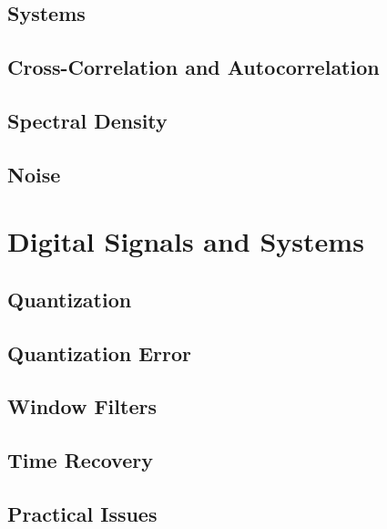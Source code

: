 \begin{refsection}
\subsection{Systems}

\subsection{Cross-Correlation and Autocorrelation}

\subsection{Spectral Density}

\subsection{Noise}

\section{Digital Signals and Systems}

\subsection{Quantization}

\subsection{Quantization Error}

\subsection{Window Filters}

\subsection{Time Recovery}

\subsection{Practical Issues}

{}
\printbibliography[heading=subbibliography]
\end{refsection}

